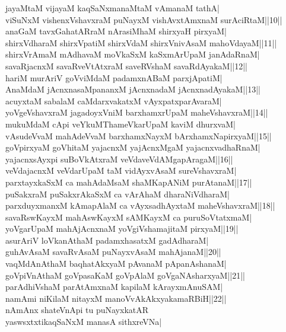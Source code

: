 \documentclass{article}
\begin{document}
jayaMtaM vijayaM kaqSaNxmanaMtaM vAmanaM tathA|\\
viSuNxM vishenxVshavxraM puNayxM vishAvxtAmxnaM surAciRtaM||10||\\
anaGaM tavxGahatARraM nArasiMhaM shirxyaH pirxyaM|\\
shirxVdharaM shirxVpatiM shirxVdaM shirxVnivAsaM mahoVdayaM||11||\\
shirxVrAmaM mAdhavaM moVkaSxM kaSxmArUpaM janAdaRnaM|\\
savaRjacnxM savaRveVtAtxraM saveRVshaM savaRdAyakaM||12||\\
hariM murAriV goVviMdaM padamxnABaM parxjApatiM|\\
AnaMdaM jAcnxnasaMpananxM jAcnxnadaM jAcnxnadAyakaM||13||\\
acuyxtaM sabalaM caMdarxvakatxM vAyxpatxparAvaraM|\\
yoVgeVshavxraM jagadoyxVniM barxhamxrUpaM maheVshavxraM||14||\\
mukuMdaM cApi veYkuMThameVkarUpaM kaviM dhurxvaM|\\
vAsudeVvaM mahAdeVvaM barxhamxNayxM bArxhamxNapirxyaM||15||\\
goVpirxyaM goVhitaM yajacnxM yajAcnxMgaM yajacnxvadhaRnaM|\\
yajacnxsAyxpi suBoVkAtxraM veVdaveVdAMgapAragaM||16||\\
veVdajacnxM veVdarUpaM taM  vidAyxvAsaM sureVshavxraM|\\
parxtayxkaSxM ca mahAdaMsaM shaMKapANiM purAtanaM||17||\\
puSakxraM puSakxrAkaSxM ca vArAhaM dharaNiVdharaM|\\
parxduyxmanxM kAmapAlaM ca vAyxsadhAyxtaM maheVshavxraM||18||\\
savaRswKayxM mahAswKayxM sAMKayxM ca puruSoVtatxmaM|\\
yoVgarUpaM mahAjAcnxnaM yoVgiVshamajitaM pirxyaM||19||\\
asurAriV loVkanAthaM padamxhasatxM gadAdharaM|\\
guhAvAsaM savaRvAsaM puNayxvAsaM mahAjanaM||20||\\
vaqMdAnAthaM baqhatAkxyaM pAvanaM pApanAshanaM|\\
goVpiVnAthaM goVpasaKaM goVpAlaM goVgaNAsharxyaM||21||\\
parAdhiVshaM parAtAmxnaM kapilaM kArayxmAnuSAM|\\
namAmi niKilaM nitayxM manoVvAkAkxyakamaRBiH||22||\\
nAmAnx shateVnApi tu puNayxkatAR\\
yaswsxtxtikaqSaNxM manasA sithxreVNa|\\
\end{document}
